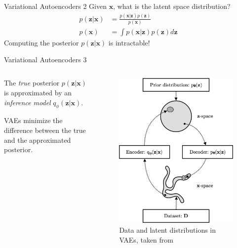 \documentclass{beamer}
\begin{document}
    \begin{frame}{Variational Autoencoders 2}
        Given $\bm{x}$, what is the latent space distribution?
        \begin{align*}
            p(\bm{z}|\bm{x}) &= \frac{p(\bm{x}|\bm{z})p(\bm{z})}{p(\bm{x})} \\
            p(\bm{x}) &= \int p(\bm{x}|\bm{z})p(\bm{z})d\bm{z}
        \end{align*}
        Computing the posterior $p(\bm{z}|\bm{x})$ is intractable!
    \end{frame}
    \begin{frame}{Variational Autoencoders 3}
        \begin{columns}
            \begin{column}{0.48\textwidth}
                The \textit{true} posterior $p(\bm{z}|\bm{x})$ is approximated by an \textit{inference model} $q_\phi(\bm{z}|\bm{x})$.

                VAEs minimize the difference between the true and the approximated posterior.
            \end{column}
            \begin{column}{0.48\textwidth}
                \begin{figure}
                    \centering
                    \includegraphics[width=.9\textwidth]{pres_imgs/vae_interplay.png}
                    \caption{Data and latent distributions in VAEs, taken from~\cite{kingma2019introduction}}
                    \label{fig:vae_interplay}
                \end{figure}
            \end{column}
        \end{columns}
    \end{frame}
\end{document}
